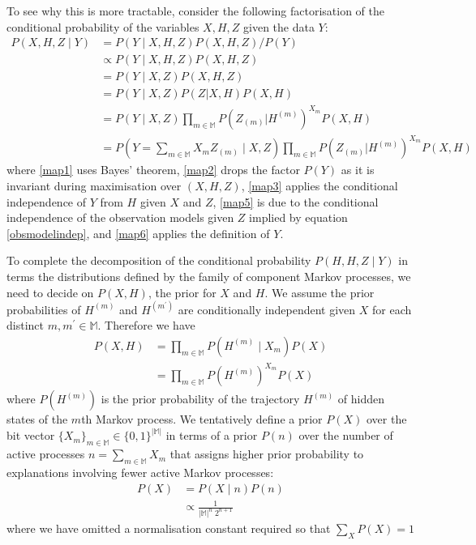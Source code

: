 \documentclass[twoside, 11pt]{article}
\newcommand{\mm}[0] {\mathbb{M}} %
\newcommand{\traj}[1] {H^{(#1)}}
\newcommand{\eventseq}[1] {Z_{(#1)}}
\begin{document}
To see why this is more tractable, consider the following factorisation of the conditional probability of the variables $X, H, Z$ given the data $Y$:
\begin{align}
P(X, H, Z \mid Y)
& = P(Y \mid X, H, Z) P(X, H, Z) / P(Y) \label{map1} \\
& \propto P(Y \mid X, H, Z) P(X, H, Z) \label{map2} \\
& = P(Y \mid X, Z) P(X, H, Z) \label{map3} \\
& = P(Y \mid X, Z) P(Z | X, H) P(X, H) \label{map4} \\
& = P\left(Y \mid X, Z\right) \prod_{m \in \mm} P\left(\eventseq m | \traj m\right)^{X_m} P(X, H) \label{map5} \\
& = P(Y = \sum_{m \in \mm} X_m \eventseq m \mid X, Z ) \prod_{m \in \mm} P\left(\eventseq m | \traj m\right)^{X_m} P(X, H) \label{map6}
\end{align}
where \ref{map1} uses Bayes' theorem, \ref{map2} drops the factor $P(Y)$ as it is invariant during maximisation over $(X, H, Z)$, \ref{map3} applies the conditional independence of $Y$ from $H$ given $X$ and $Z$, \ref{map5} is due to the conditional independence of the observation models given $Z$ implied by equation \ref{obsmodelindep}, and \ref{map6} applies the definition of $Y$.

To complete the decomposition of the conditional probability $P(H, H, Z \mid Y)$ in terms the distributions defined by the family of component Markov processes, we need to decide on $P(X, H)$, the prior for $X$ and $H$. We assume the prior probabilities of $\traj m$ and $\traj {m^{\prime}}$ are conditionally independent given $X$ for each distinct $m, m^{\prime} \in \mm$. Therefore we have
\begin{align}
P(X, H)
& = \prod_{m \in \mm} P(\traj m \mid X_m ) P(X) \\
& = \prod_{m \in \mm} P(\traj m)^{X_m} P(X)
\end{align}
where $P(\traj m)$ is the prior probability of the trajectory $\traj m$ of hidden states of the $m$th Markov process. We tentatively define a prior $P(X)$ over the bit vector $\{X_m\}_{m \in \mm} \in \{0, 1\}^{|\mm|}$ in terms of a prior $P(n)$ over the number of active processes $n = \sum_{m \in \mm} X_m$ that assigns higher prior probability to explanations involving fewer active Markov processes:
\begin{align}
P(X)
& = P(X \mid n) P(n) \\
& \propto \frac{1}{|\mm|^n \; 2^{n+1}}
\end{align}
where we have omitted a normalisation constant required so that $\sum_{X} P(X) = 1$
\end{document}
